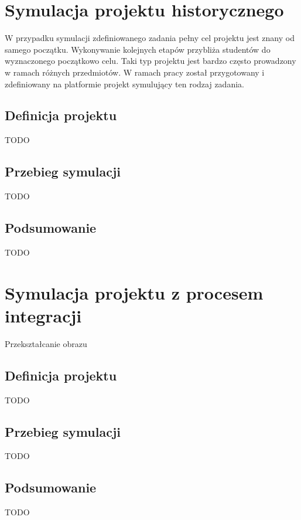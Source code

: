 \section{Symulacja projektu historycznego}

W przypadku symulacji zdefiniowanego zadania pełny cel projektu jest znany od samego początku.
Wykonywanie kolejnych etapów przybliża studentów do wyznaczonego początkowo celu.
Taki typ projektu jest bardzo często prowadzony w ramach różnych przedmiotów.
W ramach pracy został przygotowany i zdefiniowany na platformie projekt symulujący ten rodzaj zadania.


\subsection{Definicja projektu}

TODO


\subsection{Przebieg symulacji}

TODO


\subsection{Podsumowanie}

TODO


\section{Symulacja projektu z procesem integracji}

Przekształcanie obrazu


\subsection{Definicja projektu}

TODO


\subsection{Przebieg symulacji}

TODO


\subsection{Podsumowanie}

TODO


